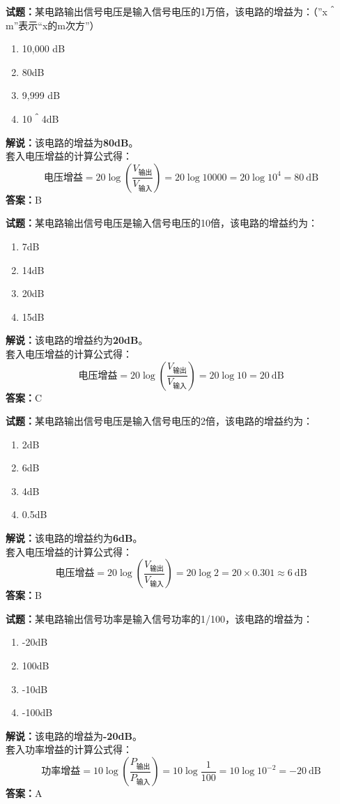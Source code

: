 \documentclass{ctexbook}
\begin{document}
\noindent\textbf{试题：}某电路输出信号电压是输入信号电压的1万倍，该电路的增益为：（”x＾m”表示“x的m次方”）
\begin{enumerate}[leftmargin=3em]
  \item 10,000 dB
  \item 80dB
  \item 9,999 dB
  \item 10＾4dB
\end{enumerate}
\noindent\textbf{解说：}该电路的增益为\textbf{80dB}。\\
套入电压增益的计算公式得：
$$\mbox{电压增益}=20 \log \left( {\frac{V_{ \mbox{输出} }}{V_{ \mbox{输入} }}} \right)=20 \log 10000=20 \log 10^4= 80 \ \mathrm{dB}$$
\noindent\textbf{答案：}B

\vspace{\baselineskip}

\noindent\textbf{试题：}某电路输出信号电压是输入信号电压的10倍，该电路的增益约为：
\begin{enumerate}[leftmargin=3em]
  \item 7dB
  \item 14dB
  \item 20dB
  \item 15dB
\end{enumerate}
\noindent\textbf{解说：}该电路的增益约为\textbf{20dB}。\\
套入电压增益的计算公式得：
$$\mbox{电压增益}=20 \log \left( {\frac{V_{ \mbox{输出} }}{V_{ \mbox{输入} }}} \right)=20 \log 10=20 \ \mathrm{dB}$$
\noindent\textbf{答案：}C

\vspace{\baselineskip}

\noindent\textbf{试题：}某电路输出信号电压是输入信号电压的2倍，该电路的增益约为：
\begin{enumerate}[leftmargin=3em]
  \item 2dB
  \item 6dB
  \item 4dB
  \item 0.5dB
\end{enumerate}
\noindent\textbf{解说：}该电路的增益约为\textbf{6dB}。\\
套入电压增益的计算公式得：
$$\mbox{电压增益}=20 \log \left( {\frac{V_{ \mbox{输出} }}{V_{ \mbox{输入} }}} \right)=20 \log 2 = 20 \times 0.301 \approx 6 \ \mathrm{dB}$$
\noindent\textbf{答案：}B

\vspace{\baselineskip}

\noindent\textbf{试题：}某电路输出信号功率是输入信号功率的1/100，该电路的增益为：
\begin{enumerate}[leftmargin=3em]
  \item -20dB
  \item 100dB
  \item -10dB
  \item -100dB
\end{enumerate}
\noindent\textbf{解说：}该电路的增益为\textbf{-20dB}。\\
套入功率增益的计算公式得：
$$\mbox{功率增益}=10 \log \left( {\frac{P_{ \mbox{输出} }}{P_{ \mbox{输入} }}} \right)=10 \log \frac{1}{100}=10 \log 10^{-2}=-20 \ \mathrm{dB}$$
\noindent\textbf{答案：}A
\end{document}
